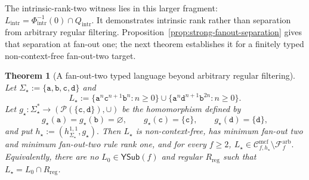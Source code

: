 \documentclass[11pt]{article}
\numberwithin{equation}{section}
\theoremstyle{plain}
\newtheorem{theorem}{Theorem}[section]
\theoremstyle{definition}
\theoremstyle{remark}
\newcommand{\Cmcf}[2]{\mathcal{C}^{\mathrm{mcf}}_{#1,#2}}
\newcommand{\YSub}[1]{\mathsf{YSub}(#1)}
\theoremstyle{plain}
\begin{document}
The intrinsic-rank-two witness lies in this larger
fragment:
\(L_{\mathrm{intr}}=\Phi_{\mathrm{intr}}^{-1}(0)\cap Q_{\mathrm{intr}}.\)
It demonstrates intrinsic rank rather than
separation from arbitrary regular filtering.
Proposition~\ref{prop:strong-fanout-separation}
gives that separation at fan-out one;
the next theorem establishes it for a
finitely typed non-context-free fan-out-two target.

\begin{theorem}[A fan-out-two typed language beyond arbitrary regular filtering]
\label{thm:arbitrary-filter-separation}
Let $\Sigma_\star:=\{\mathtt a,\mathtt b,\mathtt c,\mathtt d\}$ and
\[
 L_\star
 :=\{\mathtt a^n\mathtt c^{n+1}\mathtt b^n:n\ge0\}
   \cup
   \{\mathtt a^n\mathtt d^{n+1}\mathtt b^{2n}:n\ge0\}.
\]
Let
$g_\star:\Sigma_\star^*\to(\mathcal P(\{\mathtt c,\mathtt d\}),\cup)$
be the homomorphism defined by
\[
 g_\star(\mathtt a)=g_\star(\mathtt b)=\varnothing,
 \qquad
 g_\star(\mathtt c)=\{\mathtt c\},
 \qquad
 g_\star(\mathtt d)=\{\mathtt d\},
\]
and put
\(h_\star:=(h_{\Sigma_\star}^{1,1},g_\star).\)
Then $L_\star$ is non-context-free, has minimum fan-out two and minimum
fan-out-two rule rank one, and for every $f\ge2$,
\(L_\star\in\Cmcf{f}{h_\star} \setminus\mathcal F_f^{\mathrm{arb}}.\)
Equivalently, there are no $L_0\in\YSub{f}$ and regular $R_{\mathrm{reg}}$ such that
$L_\star=L_0\cap R_{\mathrm{reg}}$.
\end{theorem}
\end{document}
